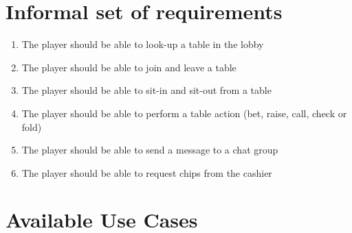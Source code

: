 \documentclass[a4paper,11pt]{report}
\begin{document}
\section{Informal set of requirements}
\begin{enumerate}
\item The player should be able to look-up a table in the lobby
\item The player should be able to join and leave a table
\item The player should be able to sit-in and sit-out from a table
\item The player should be able to perform a table action (bet, raise, call, check or fold)
\item The player should be able to send a message to a chat group
\item The player should be able to request chips from the cashier
\end{enumerate}

\section{Available Use Cases}
\end{document}
